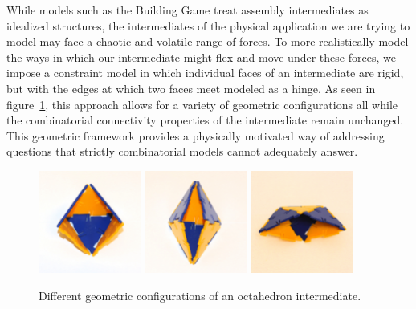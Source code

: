 
While models such as the Building Game treat assembly intermediates as idealized structures, the intermediates of the physical application we are trying to model may face a chaotic and volatile range of forces. To more realistically model the ways in which our intermediate might flex and move under these forces, we impose a constraint model in which individual faces of an intermediate are rigid, but with the edges at which two faces meet modeled as a hinge. As seen in figure~\ref{fig:OctaGCS}, this approach allows for a variety of geometric configurations all while the combinatorial connectivity properties of the intermediate remain unchanged.  This geometric framework provides a physically motivated way of addressing questions that strictly combinatorial models cannot adequately answer. 


\begin{figure}[ht]
       \centering
                \includegraphics[width=0.3\textwidth]{images/OctaGCS_0.eps}
                \includegraphics[width=0.3\textwidth]{images/OctaGCS_1.eps}
                \includegraphics[width=0.3\textwidth]{images/OctaGCS_2.eps}

\caption{Different geometric configurations of an octahedron intermediate.}
\label{fig:OctaGCS}
\end{figure}



